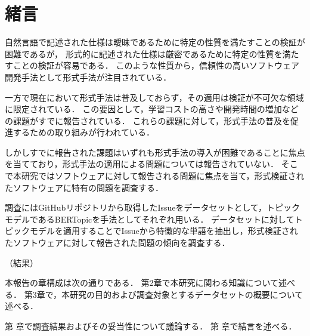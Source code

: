 \documentclass[main]{subfiles}
\begin{document}
\chapter{緒言}




自然言語で記述された仕様は曖昧であるために特定の性質を満たすことの検証が困難であるが，
形式的に記述された仕様は厳密であるために特定の性質を満たすことの検証が容易である．
このような性質から，信頼性の高いソフトウェア開発手法として形式手法が注目されている\cite{aoki:2018}．

一方で現在において形式手法は普及しておらず，その適用は検証が不可欠な領域に限定されている．
この要因として，学習コストの高さや開発時間の増加などの課題がすでに報告されている\cite{reid:2020}．
これらの課題に対して，形式手法の普及を促進するための取り組みが行われている\cite{huisman:2022,ohnishi:2020}．

しかしすでに報告された課題はいずれも形式手法の導入が困難であることに焦点を当てており，形式手法の適用による問題については報告されていない．
そこで本研究ではソフトウェアに対して報告される問題に焦点を当て，形式検証されたソフトウェアに特有の問題を調査する．

調査にはGitHubリポジトリから取得したIssueをデータセットとして，トピックモデルであるBERTopic\cite{bertopic}を手法としてそれぞれ用いる．
データセットに対してトピックモデルを適用することでIssueから特徴的な単語を抽出し，形式検証されたソフトウェアに対して報告された問題の傾向を調査する．

（結果）

本報告の章構成は次の通りである．
第2章で本研究に関わる知識について述べる．
第3章で，本研究の目的および調査対象とするデータセットの概要について述べる．

第 章で調査結果およびその妥当性について議論する．
第 章で結言を述べる．
\end{document}
